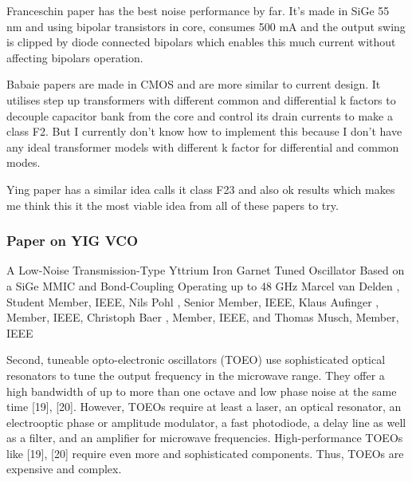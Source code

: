 
Franceschin paper has the best noise performance by far. It's made in SiGe 55 nm and using bipolar transistors in core, consumes 500 mA and the output swing is clipped by diode connected bipolars which enables this much current without affecting bipolars operation.

Babaie papers are made in CMOS and are more similar to current design. It utilises step up transformers with different common and differential k factors to decouple capacitor bank from the core and control its drain currents to make a class F2. But I currently don't know how to implement this because I don't have any ideal transformer models with different k factor for differential and common modes.

Ying paper has a similar idea calls it class F23 and also ok results which makes me think this it the most viable idea from all of these papers to try.


\subsubsection*{Paper on YIG VCO}

A Low-Noise Transmission-Type Yttrium Iron Garnet Tuned Oscillator Based on a SiGe MMIC and Bond-Coupling Operating up to 48 GHz Marcel van Delden , Student Member, IEEE, Nils Pohl , Senior Member, IEEE, Klaus Aufinger , Member, IEEE, Christoph Baer , Member, IEEE, and Thomas Musch, Member, IEEE


\begin{info}
	Second, tuneable opto-electronic oscillators (TOEO) use sophisticated optical resonators to tune the output frequency in the microwave range. They offer a high bandwidth of up to more than one octave and low phase noise at the same time [19], [20]. However, TOEOs require at least a laser, an optical resonator, an electrooptic phase or amplitude modulator, a fast photodiode, a delay line as well as a filter, and an amplifier for microwave frequencies. High-performance TOEOs like [19], [20] require even more and sophisticated components. Thus, TOEOs are expensive and complex.
\end{info}


